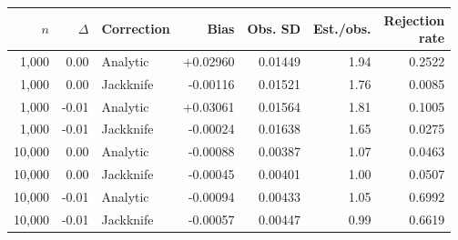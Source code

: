 \begin{tabular}{@{}rrlrrrr@{}}
\toprule
\(n\) & \(\Delta\) & Correction & Bias & Obs. SD & Est./obs. & \shortstack{Rejection\\rate}\\
\midrule
1,000 & 0.00 & Analytic & +0.02960 & 0.01449 & 1.94 & 0.2522\\
1,000 & 0.00 & Jackknife & -0.00116 & 0.01521 & 1.76 & 0.0085\\
\midrule
1,000 & -0.01 & Analytic & +0.03061 & 0.01564 & 1.81 & 0.1005\\
1,000 & -0.01 & Jackknife & -0.00024 & 0.01638 & 1.65 & 0.0275\\
\midrule
10,000 & 0.00 & Analytic & -0.00088 & 0.00387 & 1.07 & 0.0463\\
10,000 & 0.00 & Jackknife & -0.00045 & 0.00401 & 1.00 & 0.0507\\
\midrule
10,000 & -0.01 & Analytic & -0.00094 & 0.00433 & 1.05 & 0.6992\\
10,000 & -0.01 & Jackknife & -0.00057 & 0.00447 & 0.99 & 0.6619\\
\bottomrule
\end{tabular}
